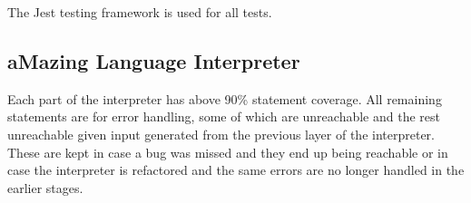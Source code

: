 The Jest testing framework is used for all tests.

\subsection{aMazing Language Interpreter}

Each part of the interpreter has above 90\% statement coverage. All remaining statements are for error handling, some of which are unreachable and the rest unreachable given input generated from the previous layer of the interpreter. These are kept in case a bug was missed and they end up being reachable or in case the interpreter is refactored and the same errors are no longer handled in the earlier stages.

